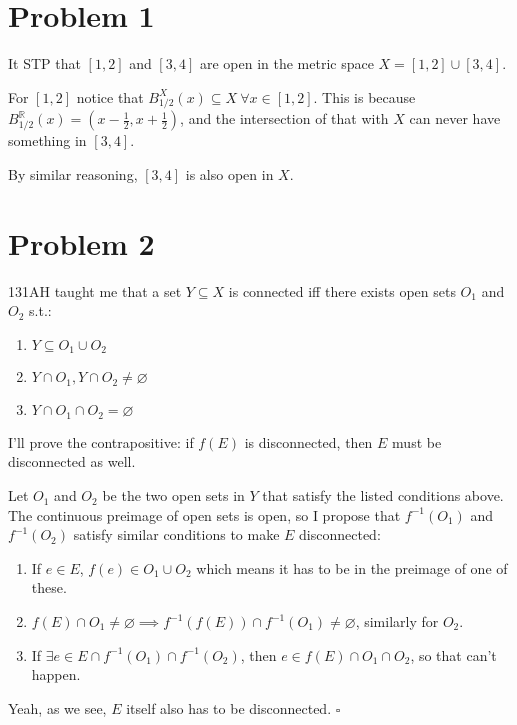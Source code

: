 \documentclass[12pt]{article}
\newcommand{\R}{\mathbb{R}}
\begin{document}
\section{Problem 1}

It STP that $[1, 2]$ and $[3, 4]$ are open in the metric space $X=[1, 2] \cup [3, 4]$.

For $[1, 2]$ notice that $B^X_{1/2}(x) \subseteq X\ \forall x \in [1, 2]$.
This is because $B^\R_{1/2}(x)=\left(x-\frac{1}{2}, x+\frac{1}{2}\right)$,
and the intersection of that with $X$ can never have something in $[3, 4]$.

By similar reasoning, $[3, 4]$ is also open in $X$.

\section{Problem 2}

131AH taught me that a set $Y \subseteq X$ is connected iff
there exists open sets $O_1$ and $O_2$ s.t.:
\begin{enumerate}[nolistsep]
  \item $Y \subseteq O_1 \cup O_2$
  \item $Y \cap O_1, Y \cap O_2 \ne \varnothing$
  \item $Y \cap O_1 \cap O_2 = \varnothing$
\end{enumerate}

I'll prove the contrapositive: if $f(E)$ is disconnected, then $E$ must be disconnected as well.

Let $O_1$ and $O_2$ be the two open sets in $Y$ that satisfy the listed conditions above.
The continuous preimage of open sets is open, so I propose that $f^{-1}(O_1)$ and $f^{-1}(O_2)$
satisfy similar conditions to make $E$ disconnected:
\begin{enumerate}
  \item If $e \in E$, $f(e) \in O_1 \cup O_2$ which means it has to be in the preimage of one of these.
  \item $f(E) \cap O_1 \ne \varnothing \implies f^{-1}(f(E)) \cap f^{-1}(O_1) \ne \varnothing$, similarly for $O_2$.
  \item If $\exists e \in E \cap f^{-1}(O_1) \cap f^{-1}(O_2)$, then $e \in f(E) \cap O_1 \cap O_2$, so that can't happen.
\end{enumerate}

Yeah, as we see, $E$ itself also has to be disconnected. $\square$

\pagebreak
\end{document}

